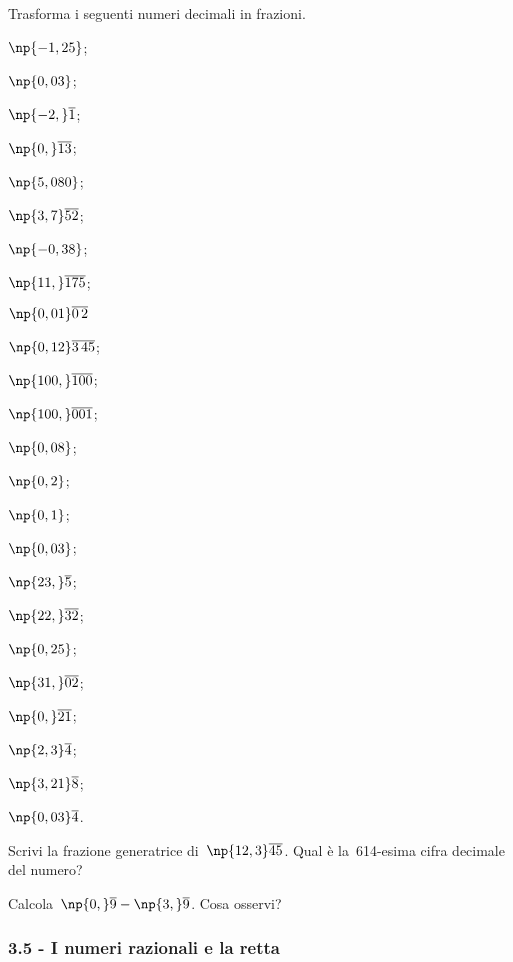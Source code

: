 \begin{esercizio}
\label{ese:3.23}
 Trasforma i seguenti numeri decimali in frazioni.
\begin{multicols}{4}
\begin{enumeratea}
\item $\np{-1,25}$;
\item $\np{0,03}$;
\item $\np{-2,}\overline{1}$;
\item $\np{0,}\overline{13}$;
\item $\np{5,080}$;
\item $\np{3,7}\overline{52}$;
\item $\np{-0,38}$;
\item $\np{11,}\overline{175}$;
\item $\np{0,01}\overline{0\,2}$
\item $\np{0,12}\overline{3\,45}$;
\item $\np{100,}\overline{100}$;
\item $\np{100,}\overline{001}$;
\item $\np{0,08}$;
\item $\np{0,2}$;
\item $\np{0,1}$;
\item $\np{0,03}$;
\item $\np{23,}\overline{5}$;
\item $\np{22,}\overline{32}$;
\item $\np{0,25}$;
\item $\np{31,}\overline{02}$;
\item $\np{0,}\overline{21}$;
\item $\np{2,3}\overline{4}$;
\item $\np{3,21}\overline{8}$;
\item $\np{0,03}\overline{4}$.
\end{enumeratea}
\end{multicols}
\end{esercizio}

\begin{esercizio}
\label{ese:3.24}
Scrivi la frazione generatrice di~$\np{12,3}\overline{45}$. Qual è la~614-esima cifra decimale del numero?
\end{esercizio}

\begin{esercizio}
\label{ese:3.25}
Calcola~$\np{0,}\overline{9}-\np{3,}\overline{9}$. Cosa osservi?
\end{esercizio}

\subsubsection*{3.5 - I numeri razionali e la retta}

